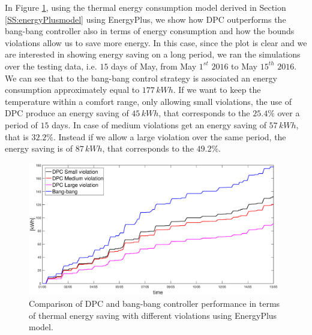 In Figure \ref{F:comparison_all_energy_E+}, using the thermal energy consumption model derived in Section \ref{SS:energyPlusmodel} using EnergyPlus, we show how DPC outperforms the bang-bang controller also in terms of energy consumption and how the bounds violations allow us to save more energy. In this case, since the plot is clear and we are interested in showing energy saving on a long period, we ran the simulations over the testing data, i.e. $15$ days of May, from May $1^{st}$ $2016$ to May $15^{th}$ $2016$. We can see that to the bang-bang control strategy is associated an energy consumption approximately equal to $177\,kWh$. If we want to keep the temperature within a comfort range, only allowing small violations, the use of DPC produce an energy saving of $45\, kWh$, that corresponds to the $25.4\%$ over a period of $15$ days. In case of medium violations get an energy saving of $57\, kWh$, that is $32.2\%$. Instead if we allow a large violation over the same period, the energy saving is of $87\, kWh$, that corresponds to the $49.2\%$.
\begin{figure}[h!]
	\begin{center}
		\includegraphics[width=26pc]{figures/Energy_all_EnergyPlus.eps}
	\end{center}
	\caption{Comparison of DPC and bang-bang controller performance in terms of thermal energy saving with different violations using EnergyPlus model.}
	\label{F:comparison_all_energy_E+}
\end{figure}






